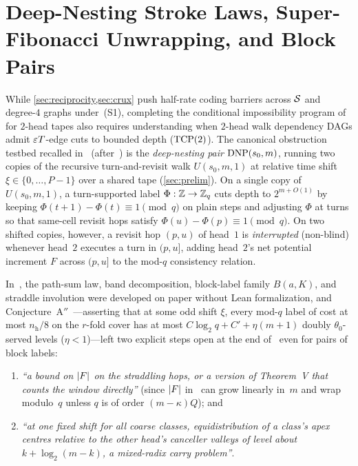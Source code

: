 \section{Deep-Nesting Stroke Laws, Super-Fibonacci Unwrapping, and Block Pairs}\label{sec:dnp}

While \cref{sec:reciprocity,sec:crux} push half-rate coding barriers across $\mathcal{S}$ and degree-$4$ graphs under~(S1),
completing the conditional impossibility program of~\cite{FourthPaper2026,EighthPaper2026} for $2$-head tapes also
requires understanding when $2$-head walk dependency DAGs admit $\varepsilon T$-edge cuts to bounded depth ($\mathrm{TCP}(2)$). The
canonical obstruction testbed recalled in~\cite[Section~2.5]{EighthPaper2026} (after~\cite[Definitions~5.3 and~5.9]{FourthPaper2026})
is the \emph{deep-nesting pair} $\mathrm{DNP}(s_0, m)$, running two copies of the recursive turn-and-revisit walk $U(s_0, m, 1)$ at
relative time shift $\xi \in \{0, \dots, P-1\}$ over a shared tape (\cref{sec:prelim}). On a single copy of $U(s_0, m, 1)$,
a turn-supported label $\Phi : \mathbb{Z} \to \mathbb{Z}_q$ cuts depth to $2^{m + O(1)}$ by keeping $\Phi(t+1) - \Phi(t) \equiv 1 \pmod q$
on plain steps and adjusting $\Phi$ at turns so that same-cell revisit hops satisfy $\Phi(u) - \Phi(p) \equiv 1 \pmod q$.
On two shifted copies, however, a revisit hop $(p, u)$ of head~$1$ is \emph{interrupted} (non-blind) whenever head~$2$
executes a turn in $(p, u]$, adding head~$2$'s net potential increment $F$ across $(p, u]$ to the mod-$q$ consistency
relation.

In~\cite[Section~5]{EighthPaper2026}, the path-sum law, band decomposition, block-label family $B(a, K)$, and straddle
involution were developed on paper without Lean formalization, and Conjecture~A$''$~\cite[Section~5.6, Conjecture~5.24]{EighthPaper2026}---asserting
that at some odd shift $\xi$, every mod-$q$ label of cost at most $n_{\mathrm{h}}/8$ on the $r$-fold cover has at most
$C\log_2 q + C' + \eta(m+1)$ doubly $\theta_0$-served levels ($\eta < 1$)---left two explicit steps open at the end
of~\cite[Section~5.6]{EighthPaper2026} even for pairs of block labels:
\begin{enumerate}
\item \emph{``a bound on $\lvert F \rvert$ on the straddling hops, or a version of Theorem~V that counts the window directly''}
  (since $\lvert F \rvert$ in~\cite[Theorem~5.21]{EighthPaper2026} can grow linearly in~$m$ and wrap modulo~$q$ unless $q$ is of
  order $(m - \kappa)Q$); and
\item \emph{``at one fixed shift for all coarse classes, equidistribution of a class's apex centres relative to the other
  head's canceller valleys of level about $k + \log_2(m - k)$, a mixed-radix carry problem''}.
\end{enumerate}

